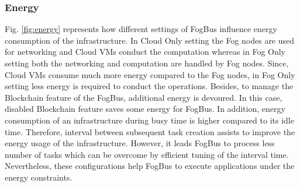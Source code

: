 \documentclass[final,5p,times,twocolumn]{elsarticle}
\begin{document}
\subsubsection{Energy}
%
Fig. \ref{fig:energy} represents how different settings of FogBus influence energy consumption of the infrastructure. In Cloud Only setting the Fog nodes are used for networking and Cloud VMs conduct the computation whereas in Fog Only setting both the networking and computation are handled by Fog nodes. Since, Cloud VMs consume much more energy compared to the Fog nodes, in Fog Only setting less energy is required to conduct the operations. Besides, to manage the Blockchain feature of the FogBus, additional energy is devoured. In this case, disabled Blockchain feature saves some energy for FogBus. In addition, energy consumption of an infrastructure during busy time is higher compared to its idle time. Therefore, interval between subsequent task creation assists to improve the energy usage of the infrastructure. However, it leads FogBus to process less number of tasks which can be overcome by efficient tuning of the interval time. Nevertheless, these configurations help FogBus to execute applications under the energy constraints.
\end{document}
